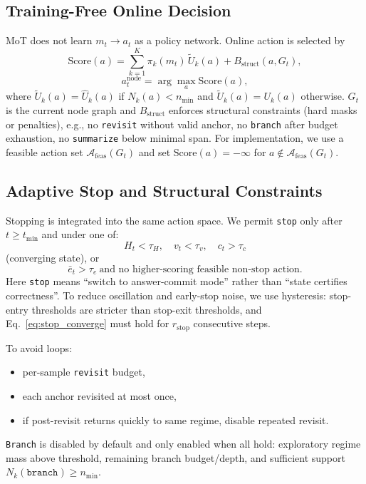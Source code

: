 \documentclass{article}
\begin{document}
\subsection{Training-Free Online Decision}
\label{sec:decision}
MoT does not learn $m_t\!\rightarrow\!a_t$ as a policy network. Online action is selected by
\begin{equation}
\mathrm{Score}(a) = \sum_{k=1}^{K}\pi_k(m_t)\,\tilde U_k(a) + B_{\mathrm{struct}}(a,G_t),
\label{eq:score}
\end{equation}
\begin{equation}
a_t^{\text{node}}=\arg\max_a \mathrm{Score}(a),
\label{eq:argmax}
\end{equation}
where $\tilde U_k(a)=\hat U_k(a)$ if $N_k(a)<n_{\min}$ and $\tilde U_k(a)=U_k(a)$ otherwise. $G_t$ is the current node graph and $B_{\mathrm{struct}}$ enforces structural constraints (hard masks or penalties), e.g., no \texttt{revisit} without valid anchor, no \texttt{branch} after budget exhaustion, no \texttt{summarize} below minimal span.
For implementation, we use a feasible action set $\mathcal{A}_{\mathrm{feas}}(G_t)$ and set $\mathrm{Score}(a)=-\infty$ for $a\notin\mathcal{A}_{\mathrm{feas}}(G_t)$.

\subsection{Adaptive Stop and Structural Constraints}
\label{sec:termination}
Stopping is integrated into the same action space. We permit \texttt{stop} only after $t\ge t_{\min}$ and under one of:
\begin{equation}
H_t<\tau_H,\quad v_t<\tau_v,\quad c_t>\tau_c
\label{eq:stop_converge}
\end{equation}
(converging state), or
\begin{equation}
\bar e_t>\tau_e \ \text{and no higher-scoring feasible non-stop action}.
\label{eq:stop_stagnant}
\end{equation}
Here \texttt{stop} means ``switch to answer-commit mode'' rather than ``state certifies correctness''.
To reduce oscillation and early-stop noise, we use hysteresis: stop-entry thresholds are stricter than stop-exit thresholds, and Eq.~\eqref{eq:stop_converge} must hold for $r_{\mathrm{stop}}$ consecutive steps.

To avoid loops:
\begin{itemize}[leftmargin=1.3em, itemsep=0.2em]
    \item per-sample \texttt{revisit} budget,
    \item each anchor revisited at most once,
    \item if post-revisit returns quickly to same regime, disable repeated revisit.
\end{itemize}
\texttt{Branch} is disabled by default and only enabled when all hold: exploratory regime mass above threshold, remaining branch budget/depth, and sufficient support $N_k(\texttt{branch})\ge n_{\min}$.
\end{document}
